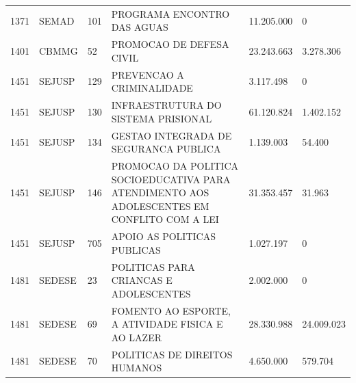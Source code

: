\documentclass{article}
\begin{document}
\begin{longtable}[c]{m{1cm}|m{1.5cm}|m{1cm}m{8cm}|m{2cm}m{2cm}}
\multicolumn{1}{C{1cm}|}{1371} & \multicolumn{1}{L{1.5cm}|}{SEMAD} & \multicolumn{1}{C{1cm}|}{101} & \multicolumn{1}{L{8cm}|}{PROGRAMA ENCONTRO DAS AGUAS} & \multicolumn{1}{R{2cm}|}{11.205.000} & \multicolumn{1}{R{2cm}}{            0} \\
\multicolumn{1}{C{1cm}|}{1401} & \multicolumn{1}{L{1.5cm}|}{CBMMG} & \multicolumn{1}{C{1cm}|}{52} & \multicolumn{1}{L{8cm}|}{PROMOCAO DE DEFESA CIVIL} & \multicolumn{1}{R{2cm}|}{23.243.663} & \multicolumn{1}{R{2cm}}{3.278.306} \\
\multicolumn{1}{C{1cm}|}{1451} & \multicolumn{1}{L{1.5cm}|}{SEJUSP} & \multicolumn{1}{C{1cm}|}{129} & \multicolumn{1}{L{8cm}|}{PREVENCAO A CRIMINALIDADE} & \multicolumn{1}{R{2cm}|}{3.117.498} & \multicolumn{1}{R{2cm}}{            0} \\
\multicolumn{1}{C{1cm}|}{1451} & \multicolumn{1}{L{1.5cm}|}{SEJUSP} & \multicolumn{1}{C{1cm}|}{130} & \multicolumn{1}{L{8cm}|}{INFRAESTRUTURA DO SISTEMA PRISIONAL} & \multicolumn{1}{R{2cm}|}{61.120.824} & \multicolumn{1}{R{2cm}}{1.402.152} \\
\multicolumn{1}{C{1cm}|}{1451} & \multicolumn{1}{L{1.5cm}|}{SEJUSP} & \multicolumn{1}{C{1cm}|}{134} & \multicolumn{1}{L{8cm}|}{GESTAO INTEGRADA DE SEGURANCA PUBLICA} & \multicolumn{1}{R{2cm}|}{1.139.003} & \multicolumn{1}{R{2cm}}{54.400} \\
\multicolumn{1}{C{1cm}|}{1451} & \multicolumn{1}{L{1.5cm}|}{SEJUSP} & \multicolumn{1}{C{1cm}|}{146} & \multicolumn{1}{L{8cm}|}{PROMOCAO DA POLITICA SOCIOEDUCATIVA PARA ATENDIMENTO AOS ADOLESCENTES EM CONFLITO COM A LEI} & \multicolumn{1}{R{2cm}|}{31.353.457} & \multicolumn{1}{R{2cm}}{31.963} \\
\multicolumn{1}{C{1cm}|}{1451} & \multicolumn{1}{L{1.5cm}|}{SEJUSP} & \multicolumn{1}{C{1cm}|}{705} & \multicolumn{1}{L{8cm}|}{APOIO AS POLITICAS PUBLICAS} & \multicolumn{1}{R{2cm}|}{1.027.197} & \multicolumn{1}{R{2cm}}{            0} \\
\multicolumn{1}{C{1cm}|}{1481} & \multicolumn{1}{L{1.5cm}|}{SEDESE} & \multicolumn{1}{C{1cm}|}{23} & \multicolumn{1}{L{8cm}|}{POLITICAS PARA CRIANCAS E ADOLESCENTES} & \multicolumn{1}{R{2cm}|}{2.002.000} & \multicolumn{1}{R{2cm}}{            0} \\
\multicolumn{1}{C{1cm}|}{1481} & \multicolumn{1}{L{1.5cm}|}{SEDESE} & \multicolumn{1}{C{1cm}|}{69} & \multicolumn{1}{L{8cm}|}{FOMENTO AO ESPORTE, A ATIVIDADE FISICA E AO LAZER} & \multicolumn{1}{R{2cm}|}{28.330.988} & \multicolumn{1}{R{2cm}}{24.009.023} \\
\multicolumn{1}{C{1cm}|}{1481} & \multicolumn{1}{L{1.5cm}|}{SEDESE} & \multicolumn{1}{C{1cm}|}{70} & \multicolumn{1}{L{8cm}|}{POLITICAS DE DIREITOS HUMANOS} & \multicolumn{1}{R{2cm}|}{4.650.000} & \multicolumn{1}{R{2cm}}{579.704} \\

\end{longtable}
\end{document}
